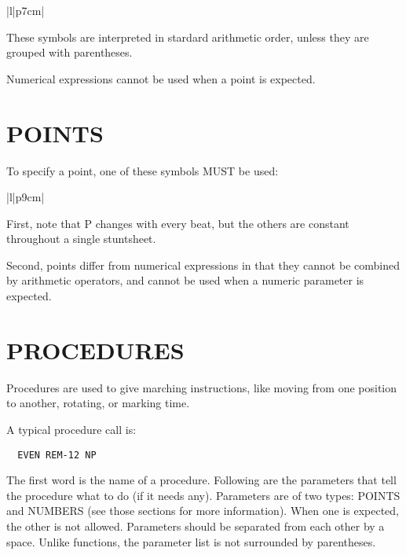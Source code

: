 \begin{tabular}{|l|p{7cm}|}\hline
{}
\end{tabular}

These symbols are interpreted in stardard arithmetic order, unless they are
grouped with parentheses.

Numerical expressions cannot be used when a point is expected.

\section{POINTS}\label{points}

To specify a point, one of these symbols MUST be used:

\begin{tabular}{|l|p{9cm}|}\hline
{}\hline\hline
{}
\end{tabular}

First, note that P changes with every beat, but the others are constant
throughout a single stuntsheet.

Second, points differ from numerical expressions in that they cannot be
combined by arithmetic operators, and cannot be used when a numeric
parameter is expected.

\section{PROCEDURES}\label{procedures}

Procedures are used to give marching instructions, like moving from one
position to another, rotating, or marking time.

A typical procedure call is:
\begin{verbatim}
  EVEN REM-12 NP
\end{verbatim}
The first word is the name of a procedure.  Following are the parameters
that tell the procedure what to do (if it needs any).  Parameters are of
two types: POINTS and NUMBERS (see those sections for more information).
When one is expected, the other is not allowed.  Parameters should be
separated from each other by a space.  Unlike functions, the parameter list
is not surrounded by parentheses.

